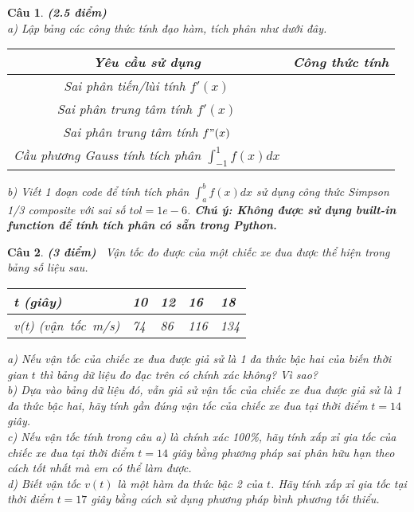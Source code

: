 \documentclass[12pt,a4paper]{exam}
\newtheorem{bt}{Câu}
\begin{document}
	\begin{bt}\textbf{(2.5 điểm)} \\ 
	a) Lập bảng các công thức tính đạo hàm, tích phân như dưới đây. 
	\begin{center}
	\begin{tabular}{|c|c|}
		\hline
		\rule[-1ex]{0pt}{2.5ex} Yêu cầu sử dụng & Công thức tính \\
		\hline
		\rule[-1ex]{0pt}{3ex} Sai phân tiến/lùi tính $f'(x)$  &  \\
		\hline
		\rule[-1ex]{0pt}{3ex} Sai phân trung tâm tính $f'(x)$ &  \\
		\hline
		\rule[-1ex]{0pt}{3ex} Sai phân trung tâm tính $f"(x)$ &  \\ 
		\hline
		\rule[-1ex]{0pt}{4ex} Cầu phương Gauss tính tích phân 
		$\int_{-1}^{1} f(x)dx$ &  \\
		\hline
	\end{tabular}
	\end{center}
	b) Viết 1 đoạn code để tính tích phân $\int_{a}^{b} f(x)dx$ sử dụng công thức Simpson 1/3 composite với sai số $tol = 1e-6$. \textbf{Chú ý: Không được sử dụng built-in function để tính tích phân có sẵn trong Python.}
	\end{bt}
	
	\begin{bt} \textbf{(3 điểm)} \ Vận tốc đo được của một chiếc xe đua được thể hiện trong bảng số liệu sau. 
		\begin{center}
			\begin{tabular}[5]{l|l|l|l|l}
				t \mbox{(giây)}   & 10 & 12 & 16 & 18 \\ \hline
				v(t) \mbox{(vận tốc m/s)} & 74 & 86 & 116 & 134
			\end{tabular}	
		\end{center}
		a) Nếu vận tốc của chiếc xe đua được giả sử là 1 đa thức bậc hai của biến thời gian $t$ thì bảng dữ liệu đo đạc trên có chính xác không? Vì sao? \\
		b) Dựa vào bảng dữ liệu đó, vẫn giả sử vận tốc của chiếc xe đua được giả sử là 1 đa thức bậc hai, hãy tính gần đúng vận tốc của chiếc xe đua tại thời điểm $t = 14$ giây.\\
		c) Nếu vận tốc tính trong câu a) là chính xác 100\%, hãy tính xấp xỉ gia tốc của chiếc xe đua tại thời điểm $t = 14$ giây bằng phương pháp sai phân hữu hạn theo cách tốt nhất mà em có thể làm được. \\
		d) Biết vận tốc $v(t)$ là một hàm đa thức bậc 2 của $t$. Hãy tính xấp xỉ gia tốc tại thời điểm $t = 17$ giây bằng cách sử dụng phương pháp bình phương tối thiểu.
	\end{bt}
	
\end{document}
